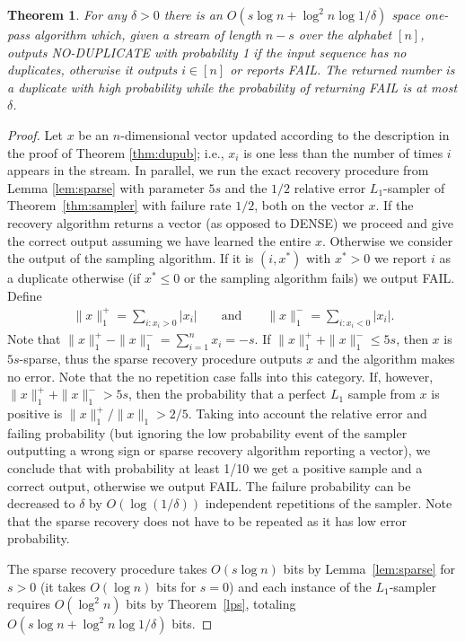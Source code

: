 \documentclass[9pt,letterpaper]{article}
\newtheorem{theorem}{Theorem}
\theoremstyle{remark}
\begin{document}
\begin{theorem}\label{dups}
For any $\delta>0$ there is an $O(s\log n+\log^2 n\log
  1/\delta)$ space one-pass algorithm which, given a stream of length $n-s$
  over the alphabet $[n]$, outputs NO-DUPLICATE with probability 
  1 if the input sequence has no duplicates, otherwise 
  it outputs $i \in [n]$ or reports FAIL. The returned number is a
  duplicate with high probability while the probability of returning FAIL is at most $\delta$.
\end{theorem}
\begin{proof} Let $x$ be an $n$-dimensional vector updated
  according to the description in the proof of Theorem \ref{thm:dupub}; i.e.,
  $x_i$ is one less than the number of times $i$ appears in the stream. In parallel,
   we run the exact recovery procedure from Lemma \ref{lem:sparse} with parameter $5s$
  and the $1/2$ relative error $L_1$-sampler of 
  Theorem~\ref{thm:sampler} with failure rate $1/2$, both on the vector $x$. If the
  recovery algorithm returns a vector (as opposed to DENSE) we proceed 
  and give the correct output
  assuming we have learned the entire $x$. Otherwise we consider the output of the sampling
  algorithm. If it is $(i,x^*)$ with $x^*>0$ we report $i$ as a duplicate
  otherwise (if $x^*\le0$ or the sampling algorithm fails) we output FAIL.
Define
\begin{align*}
\|x\|^+_1=\sum_{i:x_i>0} |x_i| & &\text{ and }& &\|x\|_1^-=\sum_{i:x_i<0} |x_i|.
\end{align*}
Note that $\|x\|^+_1-\|x\|_1^-=\sum_{i=1}^n x_i = -s$.
 If $\|x\|^+_1 + \|x\|^-_1 \leq 5s$, then $x$ is $5s$-sparse, thus the sparse
recovery procedure outputs $x$ and the algorithm makes no error. Note that the
no repetition case falls into this category. If, however,
$\|x\|^+_1 + \|x\|^-_1 > 5s$, then the probability that a perfect $L_1$ sample
from $x$ is positive is $\|x\|^+_1/\|x\|_1 > 2/5$. Taking into account the
relative error and failing probability (but ignoring the low probability event
of the sampler outputting a wrong sign or sparse recovery algorithm reporting
a vector), we conclude that with probability at
least 1/10 we get a positive sample and a correct output, otherwise we output
FAIL. The failure probability can be decreased to $\delta$ by
$O(\log(1/\delta))$ independent repetitions of the sampler. Note that the
sparse recovery does not have to be repeated as it has low error probability.

The sparse recovery procedure takes $O(s\log n)$ bits by
Lemma~\ref{lem:sparse} for $s>0$ (it takes $O(\log n)$ bits for $s=0$) and
each instance of the $L_1$-sampler requires $O(\log^2 n)$ bits by
Theorem~\ref{lps}, totaling $O(s\log n + \log^2n\log1/\delta)$ bits. 
\end{proof}
\end{document}
